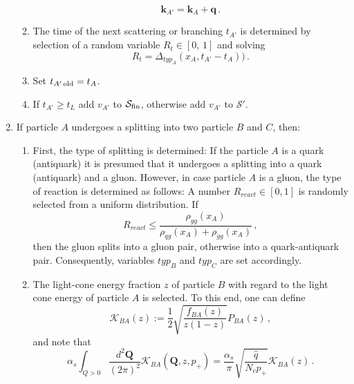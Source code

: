 \documentclass[preprint,12pt]{elsarticle}
\begin{document}
\begin{enumerate}
\begin{enumerate}
            \begin{equation}
            \mathbf{k}_{A'}=\mathbf{k}_A+\mathbf{q}\,.
            \end{equation}
    \item The time of the next scattering or branching $t_{A'}$ is determined by selection of a random variable $R_{t}\in [0,\,1]$ and solving
        \begin{equation}
        R_{t}=\Delta_{typ_A}(x_A,t_{A'}-t_A))\,.
        \label{eq:tsel2}
        \end{equation}
    \item Set $t_{A'\,{\rm old}}=t_A$.
    \item If $t_{A'}\geq t_L$ add $v_{A'}$ to $\mathcal{S}_{\rm fin}$, otherwise add $v_{A'}$ to $\mathcal{S}'$.
    \end{enumerate}
    \item If particle $A$ undergoes a splitting into two particle $B$ and $C$, then:
    \begin{enumerate}
        \item First, the type of splitting is determined: If the particle $A$ is a quark (antiquark) it is presumed that it undergoes a splitting into a quark (antiquark) and a gluon. However, in case particle $A$ is a gluon, the type of reaction is determined as follows: 
        A number $R_{react}\in [0,1]$ is randomly selected from a uniform distribution.
        If 
        \begin{equation}
          R_{react} \leq \frac{\rho_{gg}(x_A)}{\rho_{qg}(x_A)+\rho_{gg}(x_A)} \,,
          \label{eq:selsplittyp}
        \end{equation}
        then the gluon splits into a gluon pair, otherwise into a quark-antiquark pair. Consequently, variables $typ_B$ and $typ_C$ are set accordingly.
        \item The light-cone energy fraction $z$ of particle $B$ with regard to the light cone energy of particle $A$ is selected. 
        To this end, one can define
        \begin{equation}
            \mathcal{K}_{BA}(z):=\frac{1}{2}\sqrt{\frac{f_{BA}(z)}{z(1-z)}}P_{BA}(z)\,,
        \end{equation}
        and note that
        \begin{equation}
            \alpha_s \int_{Q>0} \frac{d^2\mathbf{Q}}{(2\pi)^2}\mathcal{K}_{BA}(\mathbf{Q},z,p_+)=\frac{\alpha_s}{\pi}\sqrt{\frac{\hat q}{N_cp_+}}\mathcal{K}_{BA}(z)\,.
        \end{equation}

\end{enumerate}
\end{enumerate}
\end{document}
